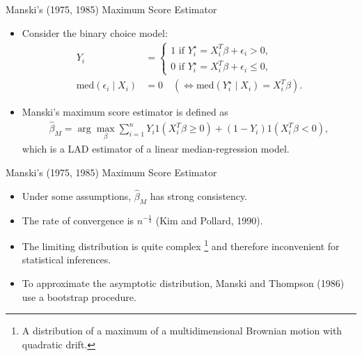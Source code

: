 \documentclass[xcolor=svgnames,dvipdfmx,cjk]{beamer}
\theoremstyle{example}
\begin{document}
\begin{frame}{Manski's (1975, 1985) Maximum Score Estimator}
\begin{itemize}
  \item Consider the binary choice model:
        \begin{align*}
          Y_i &= \left\{
            \begin{array}{l}
              1 \text{ if } Y_i^{\star} = X_i^T \beta + \epsilon_i > 0, 
              \\ 
              0 \text{ if } Y_i^{\star} = X_i^T \beta + \epsilon_i \leq 0,
            \end{array}
            \right. \\
          \text{med}(\epsilon_i \mid X_i) &= 0 \quad(\iff \text{med}(Y_i^{\star}\mid X_i)=X_i^T\beta) .
        \end{align*}
  \item \alert{Manski's maximum score estimator} is defined as
        \begin{align*}
          \hat{\beta}_M 
           =\arg \max_{\beta} 
             \sum_{i=1}^{n} Y_i 1(X_i^T \beta \geq 0)
                            +
                        (1-Y_i) 1(X_i^T \beta < 0),
        \end{align*}
        which is a LAD estimator of a linear median-regression model.
\end{itemize}
\end{frame}  
  
\begin{frame}{Manski's (1975, 1985) Maximum Score Estimator}
\begin{itemize}
  \item Under some assumptions, $\hat{\beta}_M$ has strong consistency.
  \item The rate of convergence is $n^{-\frac{1}{3}}$ (Kim and Pollard, 1990).
  \item The limiting distribution is quite complex
        \footnote{A distribution of a maximum of a multidimensional Brownian motion with quadratic drift.}
        and therefore inconvenient for statistical inferences.
  \item To approximate the asymptotic distribution, 
        Manski and Thompson (1986) use a bootstrap procedure.
\end{itemize}
\end{frame}   
  

  
\end{document}
